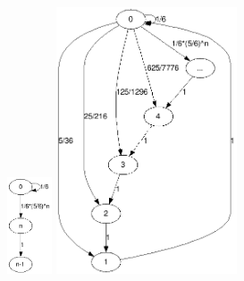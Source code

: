 \documentclass[12pt]{article}					%
\begin{document}
\begin{priklad}
	\begin{reseni}
		\includegraphics[width=0.1\textwidth]{chart4.png}
		\includegraphics[width=0.4\textwidth]{chart4B.png}
	\end{reseni}
\end{priklad}
\end{document}
